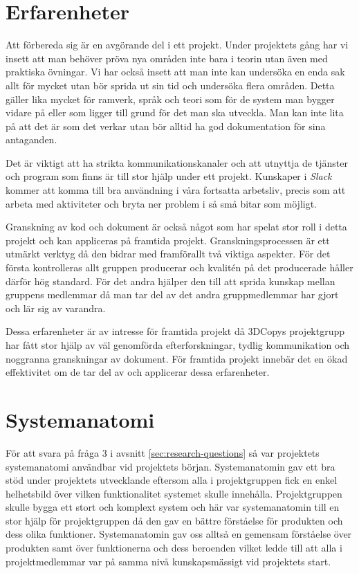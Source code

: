 \section{Erfarenheter}

Att förbereda sig är en avgörande del i ett projekt. Under projektets gång har vi insett att man behöver pröva nya områden inte bara i teorin utan även med praktiska övningar. Vi har också insett att man inte kan undersöka en enda sak allt för mycket utan bör sprida ut sin tid och undersöka flera områden. Detta gäller lika mycket för ramverk, språk och teori som för de system man bygger vidare på eller som ligger till grund för det man ska utveckla. Man kan inte lita på att det är som det verkar utan bör alltid ha god dokumentation för sina antaganden.

Det är viktigt att ha strikta kommunikationskanaler och att utnyttja de tjänster och program som finns är till stor hjälp under ett projekt. Kunskaper i \textit{Slack} kommer att komma till bra användning i våra fortsatta arbetsliv, precis som att arbeta med aktiviteter och bryta ner problem i så små bitar som möjligt.

Granskning av kod och dokument är också något som har spelat stor roll i detta projekt och kan appliceras på framtida projekt. Granskningsprocessen är ett utmärkt verktyg då den bidrar med framförallt två viktiga aspekter. För det första kontrolleras allt gruppen producerar och kvalitén på det producerade håller därför hög standard. För det andra hjälper den till att sprida kunskap mellan gruppens medlemmar då man tar del av det andra gruppmedlemmar har gjort och lär sig av varandra.

Dessa erfarenheter är av intresse för framtida projekt då 3DCopys projektgrupp har fått stor hjälp av väl genomförda efterforskningar, tydlig kommunikation och noggranna granskningar av dokument. För framtida projekt innebär det en ökad effektivitet om de tar del av och applicerar dessa erfarenheter.

\section{Systemanatomi}
För att svara på fråga 3 i avsnitt \ref{sec:research-questions} så var projektets systemanatomi användbar vid projektets början. Systemanatomin gav ett bra stöd under projektets utvecklande eftersom alla i projektgruppen fick en enkel helhetsbild över vilken funktionalitet systemet skulle innehålla. Projektgruppen skulle bygga ett stort och komplext system och här var systemanatomin till en stor hjälp för projektgruppen då den gav en bättre förståelse för produkten och dess olika funktioner. Systemanatomin gav oss alltså en gemensam förståelse över produkten samt över funktionerna och dess beroenden vilket ledde till att alla i projektmedlemmar var på samma nivå kunskapsmässigt vid projektets start.

